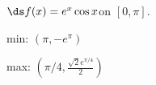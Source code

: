 {$\ds f(x) = e^x\cos x$\quad  on \quad $[0,\pi]$.
}
{min: $(\pi,-e^\pi)$

max: $(\pi/4,\frac{\sqrt{2}e^{\pi/4}}{2})$
}
